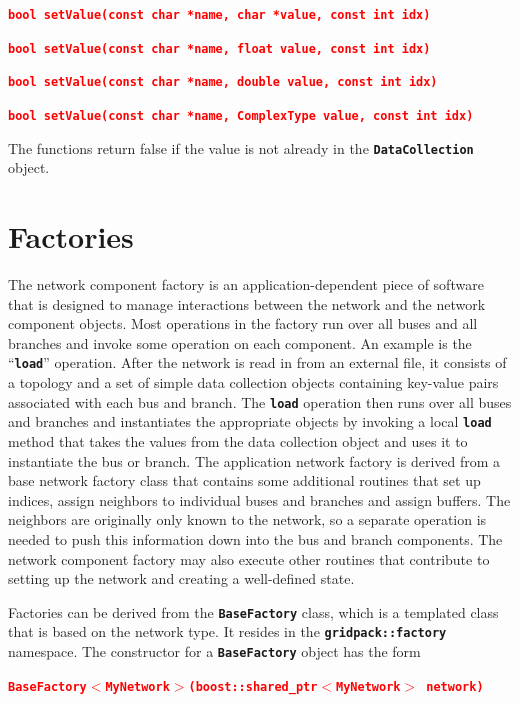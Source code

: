 \documentclass[12pt]{report} %
\begin{document}
\textcolor{red}{\texttt{\textbf{bool setValue(const char *name, char *value, const int idx)}}}

\textcolor{red}{\texttt{\textbf{bool setValue(const char *name, float value, const int idx)}}}

\textcolor{red}{\texttt{\textbf{bool setValue(const char *name, double value, const int idx)}}}

\textcolor{red}{\texttt{\textbf{bool setValue(const char *name, ComplexType value, const int idx)}}}

The functions return false if the value is not already in the \texttt{\textbf{DataCollection}} object.

\section{Factories}

The network component factory is an application-dependent piece of software that is designed to manage interactions between the network and the network component objects. Most operations in the factory run over all buses and all branches and invoke some operation on each component. An example is the ``\texttt{\textbf{load}}'' operation. After the network is read in from an external file, it consists of a topology and a set of simple data collection objects containing key-value pairs associated with each bus and branch. The \texttt{\textbf{load}} operation then runs over all buses and branches and instantiates the appropriate objects by invoking a local \texttt{\textbf{load}} method that takes the values from the data collection object and uses it to instantiate the bus or branch. The application network factory is derived from a base network factory class that contains some additional routines that set up indices, assign neighbors to individual buses and branches and assign buffers. The neighbors are originally only known to the network, so a separate operation is needed to push this information down into the bus and branch components. The network component factory may also execute other routines that contribute to setting up the network and creating a well-defined state.

Factories can be derived from the \texttt{\textbf{BaseFactory}} class, which is a templated class that is based on the network type. It resides in the \texttt{\textbf{gridpack::factory}} namespace. The constructor for a \texttt{\textbf{BaseFactory}} object has the form

\textcolor{red}{\texttt{\textbf{BaseFactory$\boldsymbol{\mathrm{<}}$MyNetwork$\boldsymbol{\mathrm{>}}$(boost::shared\_ptr$\boldsymbol{\mathrm{<}}$MyNetwork$\boldsymbol{\mathrm{>}}$ network)}}}
\end{document}
